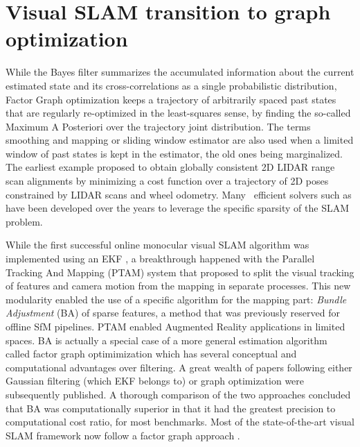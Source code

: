 \section{Visual SLAM transition to graph optimization}

While the Bayes filter summarizes  the accumulated information about the current estimated state and its cross-correlations as a single probabilistic distribution, 
Factor Graph optimization keeps a trajectory of arbitrarily spaced past states that are regularly re-optimized in the least-squares sense, by finding the so-called 
Maximum A Posteriori over the trajectory joint distribution. The terms smoothing and mapping or sliding window estimator are also used when a limited window of past states is kept 
in the estimator, the old ones being marginalized. The earliest example \cite{lu1997globally} proposed to obtain globally consistent 2D LIDAR range 
scan alignments by minimizing a cost function over a trajectory of 2D poses constrained by LIDAR scans and wheel odometry.
 Many \adhoc\ efficient solvers such as \cite{grisetti2011g2o, kaess2012isam2, ila2017slam++, ceres-solver} have been developed 
over the years to leverage the specific sparsity of the SLAM problem.

While the first successful online monocular visual SLAM algorithm was implemented using an EKF \cite{davison2007monoslam}, a breakthrough happened with the 
Parallel Tracking And Mapping (PTAM) system \cite{klein2009parallel} that proposed to split the visual tracking of features and camera motion from the 
mapping in separate processes. This new modularity enabled the use of a specific algorithm for the mapping part: \textit{Bundle Adjustment} (BA) 
\cite{triggs1999bundle, schoenberger2016sfm} of sparse features, a method that was previously reserved for offline SfM pipelines. 
PTAM enabled Augmented Reality applications in limited spaces. BA is actually a special case of a more general 
estimation algorithm called factor graph optimimization which has several conceptual and computational advantages over filtering.
A great wealth of papers following either Gaussian filtering (which EKF belongs to) or graph optimization were subsequently published. A thorough comparison 
of the two approaches \cite{strasdat2012visual} concluded that BA was computationally superior in that it had the greatest precision to 
computational cost ratio, for most benchmarks. Most of the state-of-the-art visual SLAM framework now follow a factor graph approach 
\cite{forster2017-TRO, mur2015orb, qin2018vins, leutenegger2015keyframe, ferrera2021ov}.

